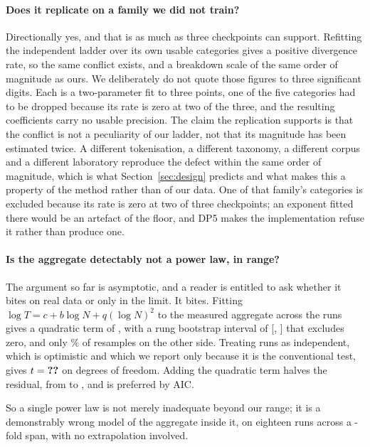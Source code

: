 \documentclass[11pt]{article}
\begin{document}
\paragraph{Does it replicate on a family we did not train?}
Directionally yes, and that is as much as three checkpoints can support. Refitting
the independent ladder over its own  usable categories gives a
positive divergence rate, so the same conflict exists, and a breakdown scale of the
same order of magnitude as ours. We deliberately do not quote those figures to three
significant digits. Each is a two-parameter fit to three points, one of the five
categories had to be dropped because its rate is zero at two of the three, and the
resulting coefficients carry no usable precision. The claim the replication supports
is that the conflict is not a peculiarity of our ladder, not that its magnitude has
been estimated twice. A different tokenisation, a different taxonomy, a
different corpus and a different laboratory reproduce the defect within the same
order of magnitude, which is what Section~\ref{sec:design} predicts and what makes
this a property of the method rather than of our data. One of that family's
categories is excluded because its rate is zero at two of three checkpoints; an
exponent fitted there would be an artefact of the floor, and DP5 makes the
implementation refuse it rather than produce one.

\paragraph{Is the aggregate detectably not a power law, in range?}
The argument so far is asymptotic, and a reader is entitled to ask whether it bites
on real data or only in the limit. It bites. Fitting
$\log T = c + b \log N + q (\log N)^2$ to the measured aggregate across the
 runs gives a quadratic term of , with a rung bootstrap
interval of [, ] that excludes zero, and only
\% of resamples on the other side. Treating runs as independent,
which is optimistic and which we report only because it is the conventional test,
gives $t = \result{curvT}$ on  degrees of freedom. Adding the
quadratic term halves the residual, from  to
, and is preferred by AIC.

So a single power law is not merely inadequate beyond our range; it is a
demonstrably wrong model of the aggregate inside it, on eighteen runs across a
-fold span, with no extrapolation involved.
\end{document}
